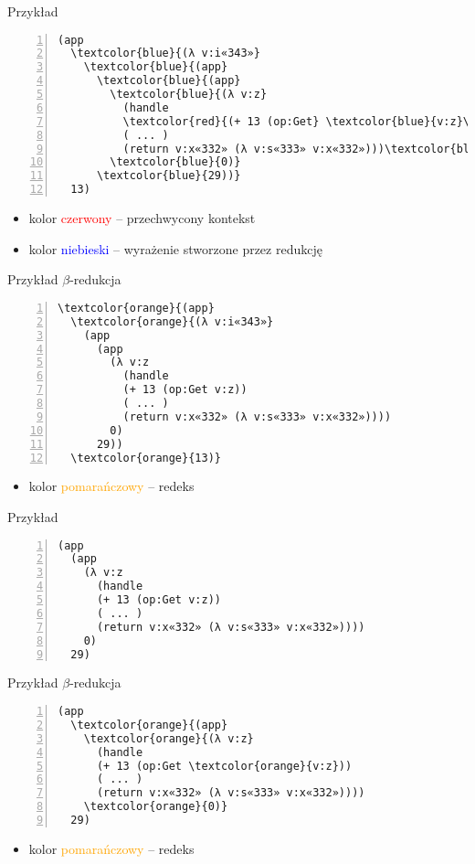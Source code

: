 \documentclass{beamer}
\begin{document}
\begin{frame}[fragile]{Przykład}
\begin{Verbatim}[commandchars=\\\{\},numbers=left]
(app
  \textcolor{blue}{(λ v:i«343»}
    \textcolor{blue}{(app}
      \textcolor{blue}{(app}
        \textcolor{blue}{(λ v:z}
          (handle
          \textcolor{red}{(+ 13 (op:Get} \textcolor{blue}{v:z}\textcolor{red}{))}
          ( ... )
          (return v:x«332» (λ v:s«333» v:x«332»)))\textcolor{blue}{)}
        \textcolor{blue}{0)}
      \textcolor{blue}{29))}
  13)
\end{Verbatim}
\begin{itemize}
  \item kolor \textcolor{red}{czerwony} -- przechwycony kontekst
  \item kolor \textcolor{blue}{niebieski} -- wyrażenie stworzone przez redukcję
\end{itemize}
\end{frame}

\begin{frame}[fragile]{Przykład}
$\beta$-redukcja
\begin{Verbatim}[commandchars=\\\{\},numbers=left]
\textcolor{orange}{(app}
  \textcolor{orange}{(λ v:i«343»}
    (app
      (app
        (λ v:z
          (handle
          (+ 13 (op:Get v:z))
          ( ... )
          (return v:x«332» (λ v:s«333» v:x«332»))))
        0)
      29))
  \textcolor{orange}{13)}
\end{Verbatim}
\begin{itemize}
  \item kolor \textcolor{orange}{pomarańczowy} -- redeks
\end{itemize}
\end{frame}

\begin{frame}[fragile]{Przykład}
\begin{Verbatim}[commandchars=\\\{\},numbers=left]
(app
  (app
    (λ v:z
      (handle
      (+ 13 (op:Get v:z))
      ( ... )
      (return v:x«332» (λ v:s«333» v:x«332»))))
    0)
  29)
\end{Verbatim}
\end{frame}

\begin{frame}[fragile]{Przykład}
$\beta$-redukcja
\begin{Verbatim}[commandchars=\\\{\},numbers=left]
(app
  \textcolor{orange}{(app}
    \textcolor{orange}{(λ v:z}
      (handle
      (+ 13 (op:Get \textcolor{orange}{v:z}))
      ( ... )
      (return v:x«332» (λ v:s«333» v:x«332»))))
    \textcolor{orange}{0)}
  29)
\end{Verbatim}
\begin{itemize}
  \item kolor \textcolor{orange}{pomarańczowy} -- redeks
\end{itemize}
\end{frame}
\end{document}
